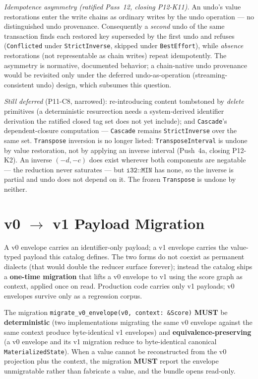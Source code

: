 \documentclass[11pt,letterpaper]{report}
\newcounter{requirement}[chapter]
\newcommand{\MUST}{\textbf{MUST}}
\begin{document}
\emph{Idempotence asymmetry (ratified Pass~12, closing P12-K11).} An undo's
value restorations enter the write chains as ordinary writes by the undo
operation --- no distinguished undo provenance. Consequently a \emph{second}
undo of the same transaction finds each restored key superseded by the first
undo and refuses (\texttt{Conflicted} under \texttt{StrictInverse}, skipped
under \texttt{BestEffort}), while \emph{absence} restorations (not
representable as chain writes) repeat idempotently. The asymmetry is
normative, documented behavior; a chain-native undo provenance would be
revisited only under the deferred undo-as-operation (streaming-consistent
undo) design, which subsumes this question.

\emph{Still deferred} (P11-C8, narrowed): re-introducing content tombstoned by
\emph{delete} primitives (a deterministic resurrection needs a system-derived
identifier derivation the ratified closed tag set does not yet include); and
\texttt{Cascade}'s dependent-closure computation --- \texttt{Cascade} remains
\texttt{StrictInverse} over the same set. \texttt{Transpose} inversion is no
longer listed: \texttt{TransposeInterval} is undone by value restoration, not by
applying an inverse interval (Push~4a, closing P12-K2). An inverse
$(-d, -c)$ does exist wherever both components are negatable --- the reduction
never saturates --- but $\texttt{i32::MIN}$ has none, so the inverse is partial
and undo does not depend on it. The frozen \texttt{Transpose} is undone by
neither.

\chapter{v0 \texorpdfstring{$\rightarrow$}{->} v1 Payload Migration}
\label{ch:migration}

A v0 envelope carries an identifier-only payload; a v1 envelope carries the
value-typed payload this catalog defines. The two forms do not coexist as
permanent dialects (that would double the reducer surface forever); instead the
catalog ships a \textbf{one-time migration} that lifts a v0 envelope to v1 using
the score graph as context, applied once on read. Production code carries only v1
payloads; v0 envelopes survive only as a regression corpus.

\begin{requirement}
\label{req:migration:properties}
The migration \texttt{migrate\_v0\_envelope(v0, context: \&Score)} \MUST{} be
\textbf{deterministic} (two implementations migrating the same v0 envelope
against the same context produce byte-identical v1 envelopes) and
\textbf{equivalence-preserving} (a v0 envelope and its v1 migration reduce to
byte-identical canonical \texttt{MaterializedState}). When a value cannot be
reconstructed from the v0 projection plus the context, the migration \MUST{}
report the envelope unmigratable rather than fabricate a value, and the bundle
opens read-only.
\end{requirement}
\end{document}
